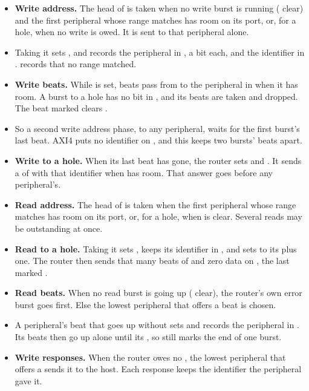 \begin{itemize}
\item \textbf{Write address.} The head of  is taken when no
write burst is running ( clear) and the first peripheral
whose range matches has room on its  port, or, for a hole,
when no write  is owed. It is sent to that peripheral
alone.
\item Taking it sets , and records the peripheral in
, a bit each, and the identifier in .
 records that no range matched.
\item \textbf{Write beats.} While  is set, beats pass from
 to the peripheral in  when it has room. A burst to
a hole has no bit in , and its beats are taken and dropped.
The beat marked  clears .
\item So a second write address phase, to any peripheral, waits for
the first burst's last beat. AXI4 puts no identifier on , and
this keeps two bursts' beats apart.
\item \textbf{Write to a hole.} When its last beat has gone, the router
sets  and . It sends a  of
 with that identifier when  has room. That answer
goes before any peripheral's.
\item \textbf{Read address.} The head of  is taken when the
first peripheral whose range matches has room on its  port,
or, for a hole, when  is clear. Several reads may be
outstanding at once.
\item \textbf{Read to a hole.} Taking it sets , keeps its
identifier in , and sets  to its
 plus one. The router then sends that many beats of
 and zero data on , the last marked .
\item \textbf{Read beats.} When no read burst is going up
( clear), the router's own error burst goes first. Else the
lowest peripheral that offers a beat is chosen.
\item A peripheral's beat that goes up without  sets
 and records the peripheral in . Its beats then
go up alone until its , so  still marks the end
of one burst.
\item \textbf{Write responses.} When the router owes no ,
the lowest peripheral that offers a  sends it to the host. Each
response keeps the identifier the peripheral gave it.
\end{itemize}

